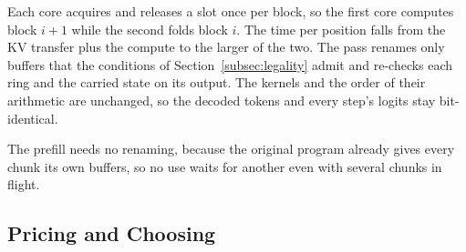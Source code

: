 Each core acquires and releases a slot once per block, so the first core computes block $i+1$ while the second folds block $i$.
The time per position falls from the KV transfer plus the compute to the larger of the two.
The pass renames only buffers that the conditions of Section~\ref{subsec:legality} admit and re-checks each ring and the carried state on its output.
The kernels and the order of their arithmetic are unchanged, so the decoded tokens and every step's logits stay bit-identical.

The prefill needs no renaming, because the original program already gives every chunk its own buffers, so no use waits for another even with several chunks in flight.

\subsection{Pricing and Choosing}
\label{subsec:pricing}
\label{subsec:split}


